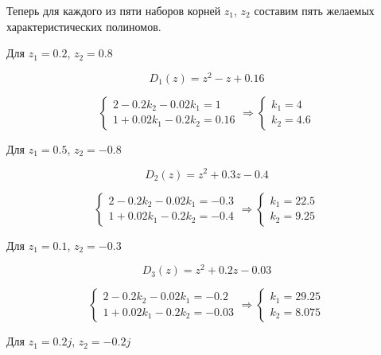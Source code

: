 Теперь для каждого из пяти наборов корней $z_1$, $z_2$ составим пять желаемых характеристических полиномов.

Для $z_1 = 0.2$, $z_2 = 0.8$

\begin{equation}
D_1(z) =	z^2 -z+0.16
\end{equation}

\begin{equation}
	\begin{cases}
		2 - 0.2k_2 -0.02k_1 = 1\\
		1 +0.02k_1-  0.2k_2 = 0.16
	\end{cases} \Rightarrow
	\begin{cases}
		k_1 = 4\\
		k_2 = 4.6
	\end{cases}
\end{equation}


Для $z_1 = 0.5$, $z_2 = -0.8$

\begin{equation}
D_2(z) =	z^2 +0.3z-0.4
\end{equation}

\begin{equation}
	\begin{cases}
		2 - 0.2k_2 -0.02k_1 = -0.3\\
		1 +0.02k_1-  0.2k_2 = -0.4
	\end{cases} \Rightarrow
	\begin{cases}
		k_1 = 22.5\\
		k_2 = 9.25
	\end{cases}
\end{equation}


Для $z_1 = 0.1$, $z_2 = -0.3$

\begin{equation}
D_3(z) =	z^2 +0.2z-0.03
\end{equation}

\begin{equation}
	\begin{cases}
		2 - 0.2k_2 -0.02k_1 = -0.2\\
		1 +0.02k_1-  0.2k_2 = -0.03
	\end{cases} \Rightarrow
	\begin{cases}
		k_1 = 29.25\\
		k_2 = 8.075
	\end{cases}
\end{equation}


Для $z_1 = 0.2j$, $z_2 = -0.2j$

